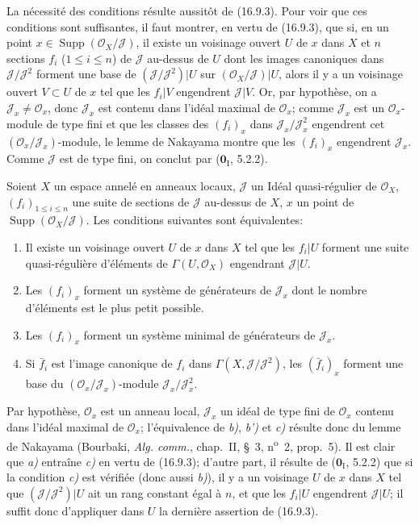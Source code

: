 La nécessité des conditions résulte aussitôt de (16.9.3). Pour voir que ces
conditions sont suffisantes, il faut montrer, en vertu de (16.9.3), que si, en
un point $x\in\operatorname{Supp}(\mathcal{O}_X/\mathscr{J})$, il existe un
voisinage ouvert $U$ de $x$ dans $X$ et $n$ sections $f_i$ ($1\leq i\leq n$)
de $\mathscr{J}$ au-dessus de $U$ dont les images canoniques dans
$\mathscr{J}/\mathscr{J}^2$ forment une base de
$(\mathscr{J}/\mathscr{J}^2)|U$ sur
$(\mathcal{O}_X/\mathscr{J})|U$, alors il y a un voisinage ouvert
$V\subset U$ de $x$ tel que les $f_i|V$ engendrent $\mathscr{J}|V$. Or, par
hypothèse, on a $\mathscr{J}_x\neq\mathcal{O}_x$, donc $\mathscr{J}_x$ est
contenu dans l'idéal maximal de $\mathcal{O}_x$; comme $\mathscr{J}_x$ est un
$\mathcal{O}_x$-module de type fini et que les classes des $(f_i)_x$ dans
$\mathscr{J}_x/\mathscr{J}_x^2$ engendrent cet
$(\mathcal{O}_x/\mathscr{J}_x)$-module, le lemme de Nakayama montre que les
$(f_i)_x$ engendrent $\mathscr{J}_x$. Comme $\mathscr{J}$ est de type fini,
on conclut par ($\mathbf{0}_{\mathrm I}$, 5.2.2).

\begin{corollary}[16.9.5]
\label{IV.16.9.5}
Soient $X$ un espace annelé en anneaux locaux, $\mathscr{J}$ un Idéal
quasi-régulier de $\mathcal{O}_X$, $(f_i)_{1\leq i\leq n}$ une suite de
sections de $\mathscr{J}$ au-dessus de $X$,
$x$ un point de $\operatorname{Supp}(\mathcal{O}_X/\mathscr{J})$. Les
conditions suivantes sont équivalentes:
\begin{enumerate}
  \item[\textup{a)}] Il existe un voisinage ouvert $U$ de $x$ dans $X$ tel que les
  $f_i|U$ forment une suite quasi-régulière d'éléments de
  $\Gamma(U,\mathcal{O}_X)$ engendrant $\mathscr{J}|U$.
  \item[\textup{b)}] Les $(f_i)_x$ forment un système de générateurs de
  $\mathscr{J}_x$ dont le nombre d'éléments est le plus petit possible.
  \item[\textup{b$'$)}] Les $(f_i)_x$ forment un système minimal de générateurs de
  $\mathscr{J}_x$.
  \item[\textup{c)}] Si $\bar f_i$ est l'image canonique de $f_i$ dans
  $\Gamma(X,\mathscr{J}/\mathscr{J}^2)$, les $(\bar f_i)_x$ forment une base
  du $(\mathcal{O}_x/\mathscr{J}_x)$-module
  $\mathscr{J}_x/\mathscr{J}_x^2$.
\end{enumerate}
\end{corollary}

Par hypothèse, $\mathcal{O}_x$ est un anneau local, $\mathscr{J}_x$ un idéal
de type fini de $\mathcal{O}_x$ contenu dans l'idéal maximal de
$\mathcal{O}_x$; l'équivalence de \emph{b)}, \emph{b')} et \emph{c)} résulte donc du lemme de
Nakayama (Bourbaki, \emph{Alg. comm.}, chap.~II, §~3,
n\textsuperscript{o}~2, prop.~5). Il est clair que \emph{a)} entraîne \emph{c)} en vertu de
(16.9.3); d'autre part, il résulte de ($\mathbf{0}_{\mathrm I}$, 5.2.2) que si la
condition \emph{c)} est vérifiée (donc aussi \emph{b)}), il y a un voisinage $U$ de $x$ dans
$X$ tel que $(\mathscr{J}/\mathscr{J}^2)|U$ ait un rang constant égal à $n$,
et que les $f_i|U$ engendrent $\mathscr{J}|U$; il suffit donc d'appliquer dans
$U$ la dernière assertion de (16.9.3).

